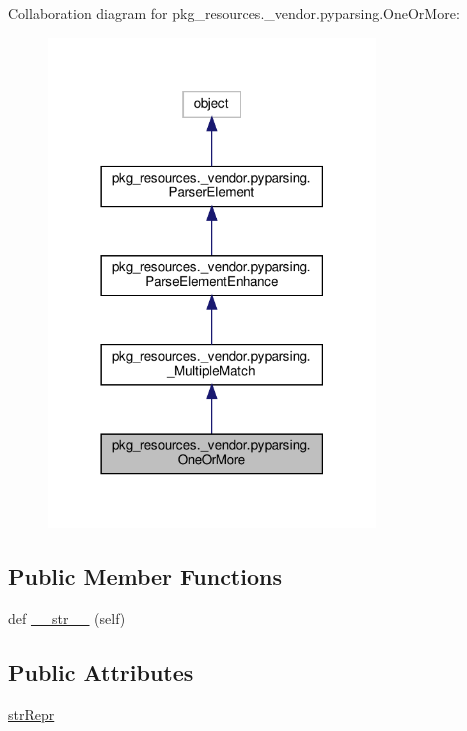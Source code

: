 Collaboration diagram for pkg\+\_\+resources.\+\_\+vendor.\+pyparsing.\+One\+Or\+More\+:
\nopagebreak
\begin{figure}[H]
\begin{center}
\leavevmode
\includegraphics[width=246pt]{classpkg__resources_1_1__vendor_1_1pyparsing_1_1OneOrMore__coll__graph}
\end{center}
\end{figure}
\subsection*{Public Member Functions}
\begin{DoxyCompactItemize}
\item 
def \hyperlink{classpkg__resources_1_1__vendor_1_1pyparsing_1_1OneOrMore_a6703409265c6f2920420b9776f322756}{\+\_\+\+\_\+str\+\_\+\+\_\+} (self)
\end{DoxyCompactItemize}
\subsection*{Public Attributes}
\begin{DoxyCompactItemize}
\item 
\hyperlink{classpkg__resources_1_1__vendor_1_1pyparsing_1_1OneOrMore_a23ad994bcaa63fcd8995c1a550ffceab}{str\+Repr}
\end{DoxyCompactItemize}
